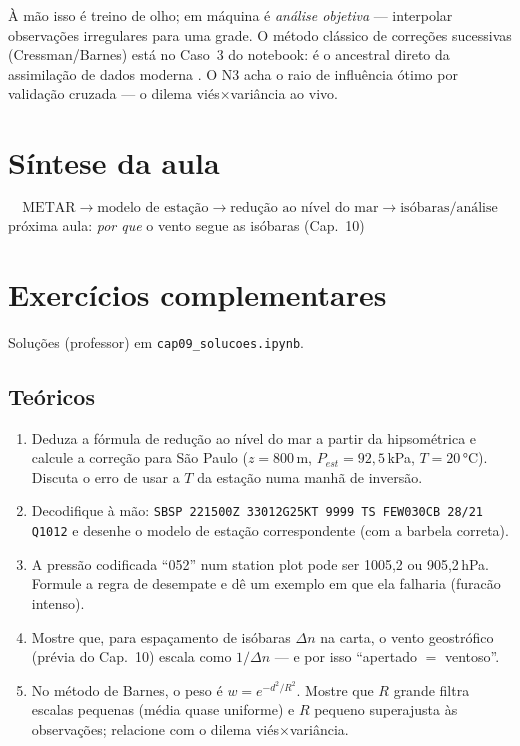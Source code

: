 \documentclass[11pt]{article}
\begin{document}
À mão isso é treino de olho; em máquina é \emph{análise objetiva} —
interpolar observações irregulares para uma grade. O método clássico de
correções sucessivas (Cressman/Barnes) está no Caso~3 do notebook: é o
ancestral direto da assimilação de dados moderna
. O N3 acha o raio de influência ótimo por
validação cruzada — o dilema viés$\times$variância ao vivo.

\section{Síntese da aula}

\begin{noquadro}
\[ \text{METAR} \to \text{modelo de estação} \to
   \text{redução ao nível do mar} \to \text{isóbaras/análise} \]
próxima aula: \emph{por que} o vento segue as isóbaras (Cap.~10)
\end{noquadro}

\section{Exercícios complementares}\label{sec:exercicios}

Soluções (professor) em \texttt{cap09\_solucoes.ipynb}.

\subsection*{Teóricos}

\begin{enumerate}[label=\textbf{T\arabic*.},itemsep=4pt]
  \item Deduza a fórmula de redução ao nível do mar a partir da
        hipsométrica e calcule a correção para São Paulo ($z = 800$\,m,
        $P_{est} = 92{,}5$\,kPa, $T = 20\,°$C). Discuta o erro de usar a
        $T$ da estação numa manhã de inversão.
  \item Decodifique à mão:
        \texttt{SBSP 221500Z 33012G25KT 9999 TS FEW030CB 28/21 Q1012} e
        desenhe o modelo de estação correspondente (com a barbela
        correta).
  \item A pressão codificada ``052'' num station plot pode ser 1005{,}2
        ou 905{,}2\,hPa. Formule a regra de desempate e dê um exemplo em
        que ela falharia (furacão intenso).
  \item Mostre que, para espaçamento de isóbaras $\Delta n$ na carta, o
        vento geostrófico (prévia do Cap.~10) escala como $1/\Delta n$ —
        e por isso ``apertado $=$ ventoso''.
  \item No método de Barnes, o peso é $w = e^{-d^2/R^2}$. Mostre que
        $R$ grande filtra escalas pequenas (média quase uniforme) e $R$
        pequeno superajusta às observações; relacione com o dilema
        viés$\times$variância.
\end{enumerate}
\end{document}
